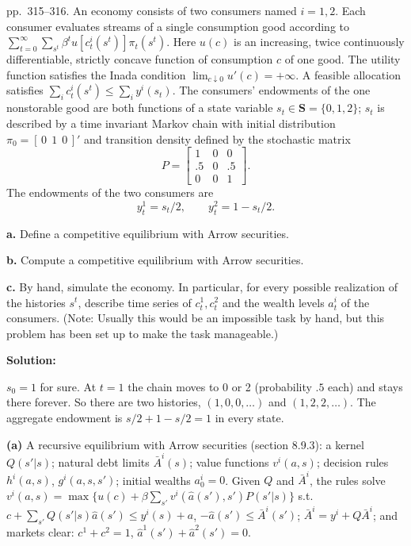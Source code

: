 \documentclass[12pt, letterpaper]{article}
\begin{document}
\begin{tcolorbox}[oddbox,title={Exercise 8.13 \quad Early resolution of uncertainty}]
\begin{tcolorbox}[questionbox]
pp.~315--316. An economy consists of two consumers named $i=1,2$. Each consumer evaluates streams of a
single consumption good according to $\sum_{t=0}^\infty\sum_{s^t}\beta^tu[c^i_t(s^t)]\pi_t(s^t)$. Here $u(c)$ is an
increasing, twice continuously differentiable, strictly concave function of consumption $c$ of one good.
The utility function satisfies the Inada condition $\lim_{c\downarrow0}u'(c)=+\infty$. A feasible allocation
satisfies $\sum_ic^i_t(s^t)\le\sum_iy^i(s_t)$. The consumers' endowments of the one nonstorable good are
both functions of a state variable $s_t\in\mathbf S=\{0,1,2\}$; $s_t$ is described by a time invariant Markov
chain with initial distribution $\pi_0=[\,0\ \ 1\ \ 0\,]'$ and transition density defined by the stochastic
matrix
\[
P=\begin{bmatrix}1&0&0\\.5&0&.5\\0&0&1\end{bmatrix}.
\]
The endowments of the two consumers are
\[
y^1_t=s_t/2,\qquad y^2_t=1-s_t/2.
\]

\textbf{a.} Define a competitive equilibrium with Arrow securities.

\textbf{b.} Compute a competitive equilibrium with Arrow securities.

\textbf{c.} By hand, simulate the economy. In particular, for every possible realization of the histories
$s^t$, describe time series of $c^1_t,c^2_t$ and the wealth levels $a^i_t$ of the consumers. (Note: Usually
this would be an impossible task by hand, but this problem has been set up to make the task manageable.)
\end{tcolorbox}

\textbf{Solution:}

$s_0=1$ for sure. At $t=1$ the chain moves to 0 or 2 (probability $.5$ each) and stays there forever. So
there are two histories, $(1,0,0,\dots)$ and $(1,2,2,\dots)$. The aggregate endowment is
$s/2+1-s/2=1$ in every state.

\textbf{(a)} A recursive equilibrium with Arrow securities (section 8.9.3): a kernel $Q(s'|s)$; natural debt limits
$\bar A^i(s)$; value functions $v^i(a,s)$; decision rules $h^i(a,s)$, $g^i(a,s,s')$; initial wealths
$a^i_0=0$. Given $Q$ and $\bar A^i$, the rules solve
$v^i(a,s)=\max\{u(c)+\beta\sum_{s'}v^i(\hat a(s'),s')P(s'|s)\}$ s.t.\
$c+\sum_{s'}Q(s'|s)\hat a(s')\le y^i(s)+a$, $-\hat a(s')\le\bar A^i(s')$; $\bar A^i=y^i+Q\bar A^i$; and markets
clear: $c^1+c^2=1$, $\hat a^1(s')+\hat a^2(s')=0$.


\end{tcolorbox}
\end{document}

